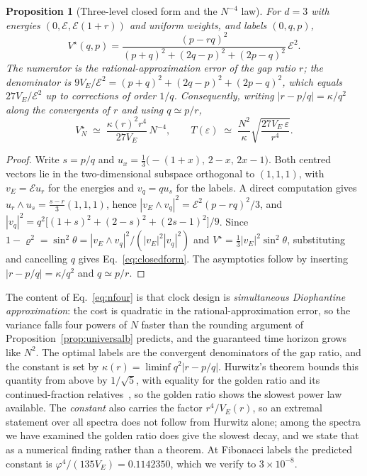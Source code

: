 \documentclass[aps,prd,onecolumn,notitlepage,10pt,amsmath,amssymb,amsfonts,nofootinbib]{revtex4-2}
\newtheorem{proposition}{Proposition}
\theoremstyle{definition}
\theoremstyle{remark}
\begin{document}
\begin{proposition}[Three-level closed form and the $N^{-4}$ law]
\label{prop:closedform}
For $d=3$ with energies $(0,\mathcal{E},\mathcal{E}(1+r))$ and uniform weights, and labels $(0,q,p)$,
\begin{equation}
  V^\star(q,p)=\frac{(p-rq)^2}{(p+q)^2+(2q-p)^2+(2p-q)^2}\,\mathcal{E}^2 .
  \label{eq:closedform}
\end{equation}
The numerator is the rational-approximation error of the gap ratio $r$; the denominator is $9V_E/\mathcal{E}^2=(p+q)^2+(2q-p)^2+(2p-q)^2$, which equals $27V_E/\mathcal{E}^2$ up to corrections of order $1/q$. Consequently, writing $|r-p/q|=\kappa/q^2$ along the convergents of $r$ and using $q\simeq p/r$,
\begin{equation}
  V^\star_N\;\simeq\;\frac{\kappa(r)^2r^4}{27V_E}\,N^{-4},
  \qquad
  T(\varepsilon)\;\simeq\;\frac{N^2}{\kappa}\sqrt{\frac{27V_E\,\varepsilon}{r^4}} .
  \label{eq:nfour}
\end{equation}
\end{proposition}
\begin{proof}
Write $s=p/q$ and $u_x=\frac13\big(-(1+x),\,2-x,\,2x-1\big)$. Both centred vectors lie in the two-dimensional subspace orthogonal to $(1,1,1)$, with $v_E=\mathcal{E}u_r$ for the energies and $v_q=qu_s$ for the labels. A direct computation gives $u_r\wedge u_s=\frac{s-r}{3}(1,1,1)$, hence $|v_E\wedge v_q|^2=\mathcal{E}^2(p-rq)^2/3$, and $|v_q|^2=q^2\big[(1+s)^2+(2-s)^2+(2s-1)^2\big]/9$. Since $1-\varrho^2=\sin^2\theta=|v_E\wedge v_q|^2/(|v_E|^2|v_q|^2)$ and $V^\star=\frac13|v_E|^2\sin^2\theta$, substituting and cancelling $q$ gives Eq.~\eqref{eq:closedform}. The asymptotics follow by inserting $|r-p/q|=\kappa/q^2$ and $q\simeq p/r$.
\end{proof}

The content of Eq.~\eqref{eq:nfour} is that clock design is \emph{simultaneous Diophantine approximation}: the cost is quadratic in the rational-approximation error, so the variance falls four powers of $N$ faster than the rounding argument of Proposition~\ref{prop:universalb} predicts, and the guaranteed time horizon grows like $N^2$. The optimal labels are the convergent denominators of the gap ratio, and the constant is set by $\kappa(r)=\liminf q^2|r-p/q|$. Hurwitz's theorem bounds this quantity from above by $1/\sqrt5$, with equality for the golden ratio and its continued-fraction relatives~\cite{Hurwitz1891}, so the golden ratio shows the slowest power law available. The \emph{constant} also carries the factor $r^4/V_E(r)$, so an extremal statement over all spectra does not follow from Hurwitz alone; among the spectra we have examined the golden ratio does give the slowest decay, and we state that as a numerical finding rather than a theorem. At Fibonacci labels the predicted constant is $\varphi^4/(135V_E)=0.1142350$, which we verify to $3\times10^{-8}$.
\end{document}
